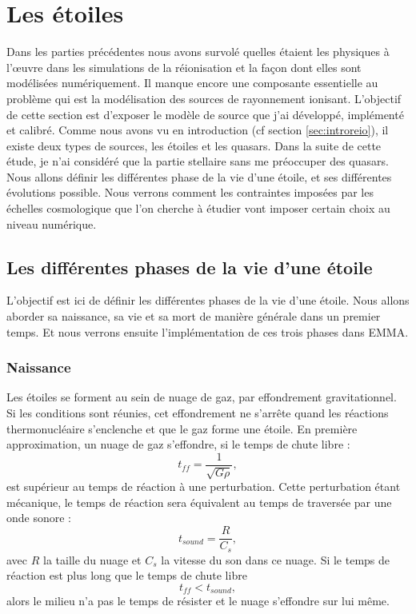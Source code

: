 \chapter{Les étoiles}
\label{sec:etoiles}

Dans les parties précédentes nous avons survolé quelles étaient les physiques à l’œuvre dans les simulations de la réionisation et la façon dont elles sont modélisées numériquement.
Il manque encore une composante essentielle au problème qui est la modélisation des sources de rayonnement ionisant.
L'objectif de cette section est d'exposer le modèle de source que j'ai développé, implémenté et calibré.
Comme nous avons vu en introduction (cf section \ref{sec:introreio}), il existe deux types de sources, les étoiles et les quasars.
Dans la suite de cette étude, je n'ai considéré que la partie stellaire sans me préoccuper des quasars.
Nous allons définir les différentes phase de la vie d'une étoile, et ses différentes évolutions possible.
Nous verrons comment les contraintes imposées par les échelles cosmologique que l'on cherche à étudier vont imposer certain choix au niveau numérique.

\section{Les différentes phases de la vie d'une étoile}

L'objectif est ici de définir les différentes phases de la vie d'une étoile.
Nous allons aborder sa naissance, sa vie et sa mort de manière générale dans un premier temps.
Et nous verrons ensuite l'implémentation de ces trois phases dans EMMA.

\subsection{Naissance}


Les étoiles se forment au sein de nuage de gaz,  par effondrement gravitationnel.
Si les conditions sont réunies, cet effondrement ne s'arrête quand les réactions thermonucléaire s'enclenche et que le gaz forme une étoile.
En première approximation, un nuage de gaz s'effondre, si le temps de chute libre : 
\begin{equation}
t_{ff} = \frac{1}{\sqrt{G \rho}},
\end{equation}
est supérieur au temps de réaction à une perturbation.
Cette perturbation étant mécanique, le temps de réaction sera équivalent au temps de traversée par une onde sonore :
 \begin{equation}
t_{sound} = \frac{R}{C_s},
\end{equation}
avec $R$ la taille du nuage et $C_s$ la vitesse du son dans ce nuage.
Si le temps de réaction est plus long que le temps de chute libre
\begin{equation}
t_{ff} < t_{sound},
\end{equation}
alors le milieu n'a pas le temps de résister et le nuage s'effondre sur lui même.


